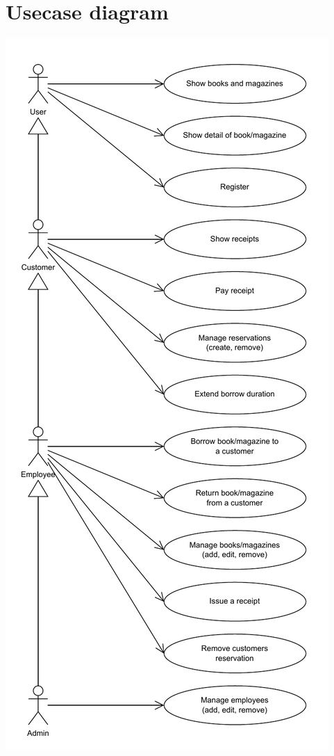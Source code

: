 \documentclass{article}
\begin{document}
\newpage

\section*{Usecase diagram}

\begin{center}
    \includegraphics*[height=0.95\textheight]{assets/usecase.pdf}
\end{center}
\end{document}
